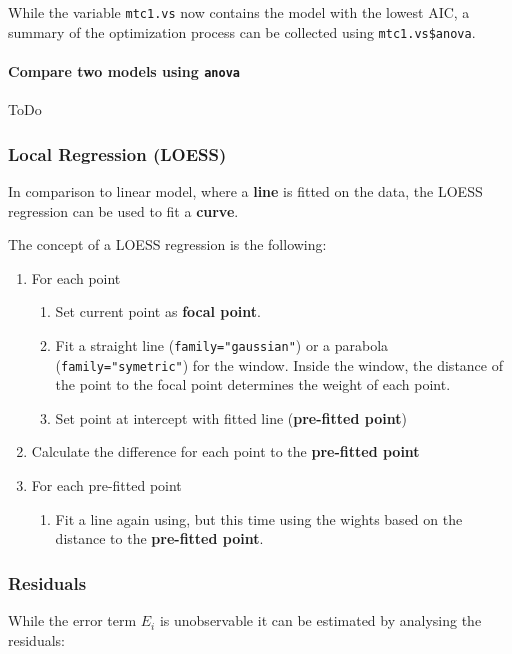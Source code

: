 While the variable \lstinline{mtc1.vs} now contains the model with the lowest AIC, a summary of the optimization process can be collected using \lstinline{mtc1.vs$anova}.

\paragraph{Compare two models using \lstinline{anova}}
ToDo %

\subsubsection{Local Regression (LOESS)}
In comparison to linear model, where a \textbf{line} is fitted on the data, the LOESS regression can be used to fit a \textbf{curve}.

The concept of a LOESS regression is the following:

\begin{enumerate}
	\tightlist
	\item For each point
	\begin{enumerate}
		\tightlist
		\item Set current point as \textbf{focal point}.
		\item Fit a straight line (\lstinline{family="gaussian"}) or a parabola (\lstinline{family="symetric"}) for the window. Inside the window, the distance of the point to the focal point determines the weight of each point.
		\item Set point at intercept with fitted line (\textbf{pre-fitted point})
	\end{enumerate}
	\item Calculate the difference for each point to the \textbf{pre-fitted point}
	\item For each pre-fitted point
	\begin{enumerate}
		\item Fit a line again using, but this time using the wights based on the distance to the \textbf{pre-fitted point}.
	\end{enumerate}
\end{enumerate}

\subsubsection{Residuals}

While the error term $E_i$ is unobservable it can be estimated by analysing the residuals:

